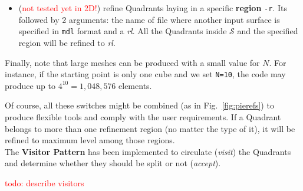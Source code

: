 \documentclass[10pt]{article}
\begin{document}
\begin{itemize}
\begin{minipage}[c]{0.65\textwidth}
\end{minipage}
\item (\textcolor{red}{not tested yet in 2D!}) refine Quadrants laying in a specific \textbf{region} \texttt{-r}. Its followed by 2 arguments: the name of file where another input surface is specified in \texttt{mdl} format and a \textit{rl}. All the Quadrants inside $\mathcal{S}$ and the specified region will be refined to \textit{rl}. %
\end{itemize}

Finally, note that large meshes can be produced with a small value for $N$. For instance, if the starting point is only one cube and we set \texttt{N=10}, the code may produce up to $4^{10} = 1,048,576$ elements.

Of course, all these switches might be combined (as in Fig.~\ref{fig:pierefs}) to produce flexible tools and comply with the user requirements. If a Quadrant belongs to more than one refinement region (no matter the type of it), it will be refined to maximum level among those regions.\\

The \textbf{Visitor Pattern} has been implemented to circulate (\textit{visit}) the Quadrants and determine whether they should be split or not (\textit{accept}).

\textcolor{red}{todo: describe visitors}
\end{document}
